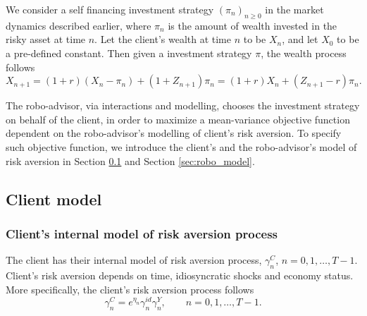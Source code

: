 We consider a self financing investment strategy $(\pi_n)_{n\geq 0}$ in the market dynamics described earlier, where $\pi_n$ is the amount of wealth invested in the risky asset at time $n$. Let the client's wealth at time $n$ to be $X_n$, and let $X_0$ to be a pre-defined constant. Then given a investment strategy $\pi$, the wealth process follows \begin{equation}
    X_{n+1}=(1+r)(X_n-\pi_n) + (1+Z_{n+1})\pi_n=(1+r)X_n+(Z_{n+1}-r)\pi_n.
\end{equation}

The robo-advisor, via interactions and modelling, chooses the investment strategy on behalf of the client, in order to maximize a mean-variance objective function dependent on the robo-advisor's modelling of client's risk aversion. To specify such objective function, we introduce the client's and the robo-advisor's model of risk aversion in Section \ref{sec:client_model} and Section \ref{sec:robo_model}.

\subsection{Client model}\label{sec:client_model}
\subsubsection{Client's internal model of risk aversion process}
The client has their internal model of risk aversion process, $\gamma_n^C$, $n=0,1,\ldots,T-1$. Client's risk aversion depends on time, idiosyncratic shocks and economy status. More specifically, the client's risk aversion process follows\begin{equation}
    \gamma_n^C=e^{\eta_n}\gamma_n^{id}\gamma_n^Y, \qquad n=0,1,\ldots,T-1.
\end{equation}

